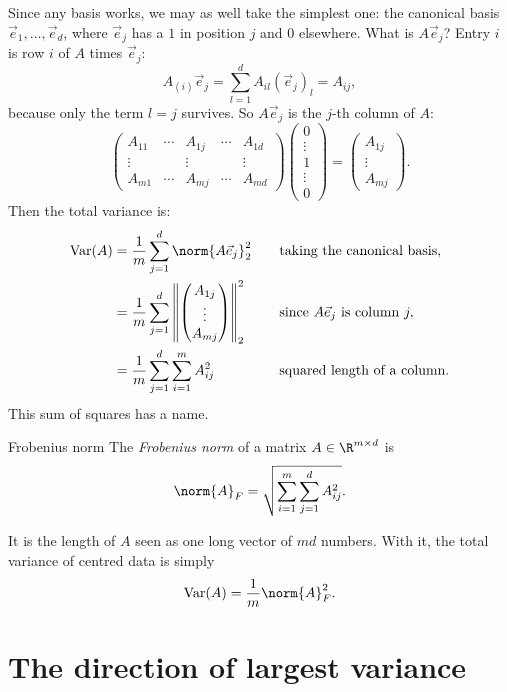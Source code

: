 \documentclass[a4paper,12pt,oneside]{report}
\begin{document}
Since any basis works, we may as well take the simplest one: the
canonical basis $\vec e_1,\ldots,\vec e_d$, where $\vec e_j$ has a $1$
in position $j$ and $0$ elsewhere. What is $A\vec e_j$? Entry $i$ is
row $i$ of $A$ times $\vec e_j$:
\[
  A_{(i)}\vec e_j=\sum_{l=1}^{d}A_{il}(\vec e_j)_l=A_{ij},
\]
because only the term $l=j$ survives. So $A\vec e_j$ is the $j$-th
column of $A$:
\[
  \begin{pmatrix}
    A_{11}&\cdots&A_{1j}&\cdots&A_{1d}\\
    \vdots&&\vdots&&\vdots\\
    A_{m1}&\cdots&A_{mj}&\cdots&A_{md}
  \end{pmatrix}
  \begin{pmatrix}0\\\vdots\\1\\\vdots\\0\end{pmatrix}
  =\begin{pmatrix}A_{1j}\\\vdots\\A_{mj}\end{pmatrix}.
\]
Then the total variance is:
\[
\begin{aligned}
  \mathrm{Var}(A)
    &=\frac1m\sum_{j=1}^{d}\norm{A\vec e_j}_2^2
      &&\quad\text{taking the canonical basis},\\
    &=\frac1m\sum_{j=1}^{d}\left\|\begin{pmatrix}A_{1j}\\\vdots\\A_{mj}\end{pmatrix}\right\|_2^2
      &&\quad\text{since } A\vec e_j \text{ is column } j,\\
    &=\frac1m\sum_{j=1}^{d}\sum_{i=1}^{m}A_{ij}^2
      &&\quad\text{squared length of a column}.
\end{aligned}
\]
This sum of squares has a name.

\begin{frameddefn}{Frobenius norm}
\label{def:frobenius-norm}
The \emph{Frobenius norm} of a matrix $A\in\R^{m\times d}$ is
\[
  \norm{A}_F=\sqrt{\sum_{i=1}^{m}\sum_{j=1}^{d}A_{ij}^2}.
\]
\end{frameddefn}

It is the length of $A$ seen as one long vector of $md$ numbers. With
it, the total variance of centred data is simply
\[
  \mathrm{Var}(A)=\frac1m\norm{A}_F^2 .
\]

\section{The direction of largest variance}
\label{sec:largest-variance}
\end{document}
